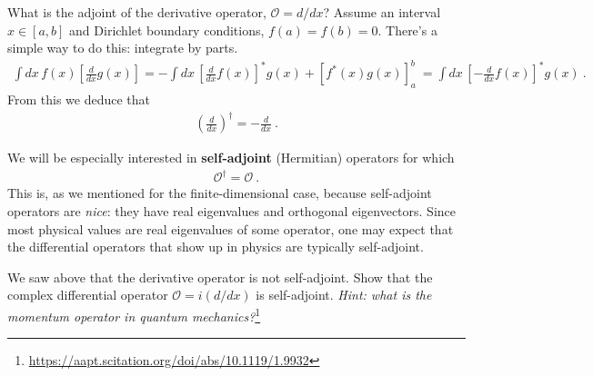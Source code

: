 \begin{example}
What is the adjoint of the derivative operator, $\mathcal O = d/dx$? Assume an interval $x\in[a,b]$ and Dirichlet boundary conditions, $f(a)=f(b)=0$. There's a simple way to do this: integrate by parts.
\begin{align}
  \int dx \,  f(x) \left[\frac{d}{dx} g(x)\right]
  =
  - \int dx \, \left[\frac{d}{dx}f(x)\right]^* g(x)
  +
  \left[f^*(x)g(x)\right]^b_a \ 
  =
  \int dx \, \left[-\frac{d}{dx}f(x)\right]^* g(x)
  \ . 
\end{align}
From this we deduce that
\begin{align}
  \left(\frac{d}{dx}\right)^\dag = -\frac{d}{dx} \ .
\end{align}
\end{example}



We will be especially interested in \textbf{self-adjoint} (Hermitian) operators for which
\begin{align}
  \mathcal O^\dag = \mathcal O \ .
\end{align}
This is, as we mentioned for the finite-dimensional case, because self-adjoint operators are \emph{nice}: they have real eigenvalues and orthogonal eigenvectors. Since most physical values are real eigenvalues of some operator, one may expect that the differential operators that show up in physics are typically self-adjoint.
\begin{exercise}
We saw above that the derivative operator is not self-adjoint. Show that the complex differential operator $\mathcal O=i(d/dx)$ is self-adjoint. \emph{Hint: what is the momentum operator in quantum mechanics?}\footnote{\url{https://aapt.scitation.org/doi/abs/10.1119/1.9932}} 
\end{exercise}


